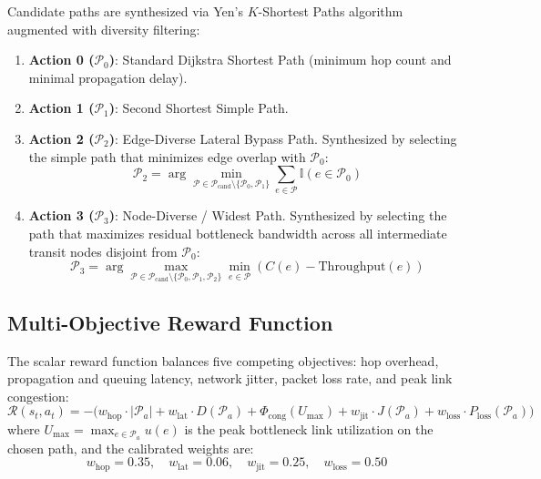 Candidate paths are synthesized via Yen's $K$-Shortest Paths algorithm \cite{yen1971finding} augmented with diversity filtering:
\begin{enumerate}
    \item \textbf{Action 0 ($\mathcal{P}_0$)}: Standard Dijkstra Shortest Path (minimum hop count and minimal propagation delay).
    \item \textbf{Action 1 ($\mathcal{P}_1$)}: Second Shortest Simple Path.
    \item \textbf{Action 2 ($\mathcal{P}_2$)}: Edge-Diverse Lateral Bypass Path. Synthesized by selecting the simple path that minimizes edge overlap with $\mathcal{P}_0$:
    \begin{equation}
        \mathcal{P}_2 = \arg\min_{\mathcal{P} \in \mathcal{P}_{\text{cand}} \setminus \{\mathcal{P}_0, \mathcal{P}_1\}} \sum_{e \in \mathcal{P}} \mathbb{I}(e \in \mathcal{P}_0)
    \end{equation}
    \item \textbf{Action 3 ($\mathcal{P}_3$)}: Node-Diverse / Widest Path. Synthesized by selecting the path that maximizes residual bottleneck bandwidth across all intermediate transit nodes disjoint from $\mathcal{P}_0$:
    \begin{equation}
        \mathcal{P}_3 = \arg\max_{\mathcal{P} \in \mathcal{P}_{\text{cand}} \setminus \{\mathcal{P}_0, \mathcal{P}_1, \mathcal{P}_2\}} \min_{e \in \mathcal{P}} \left( C(e) - \text{Throughput}(e) \right)
    \end{equation}
\end{enumerate}

\subsection{Multi-Objective Reward Function}
The scalar reward function balances five competing objectives: hop overhead, propagation and queuing latency, network jitter, packet loss rate, and peak link congestion:
\begin{equation}
    \mathcal{R}(s_t, a_t) = - \Big( w_{\text{hop}} \cdot |\mathcal{P}_a| + w_{\text{lat}} \cdot D(\mathcal{P}_a) + \Phi_{\text{cong}}(U_{\max}) + w_{\text{jit}} \cdot J(\mathcal{P}_a) + w_{\text{loss}} \cdot P_{\text{loss}}(\mathcal{P}_a) \Big)
    \label{eq:multi_objective_reward}
\end{equation}
where $U_{\max} = \max_{e \in \mathcal{P}_a} u(e)$ is the peak bottleneck link utilization on the chosen path, and the calibrated weights are:
\begin{equation}
    w_{\text{hop}} = 0.35, \quad w_{\text{lat}} = 0.06, \quad w_{\text{jit}} = 0.25, \quad w_{\text{loss}} = 0.50
\end{equation}

